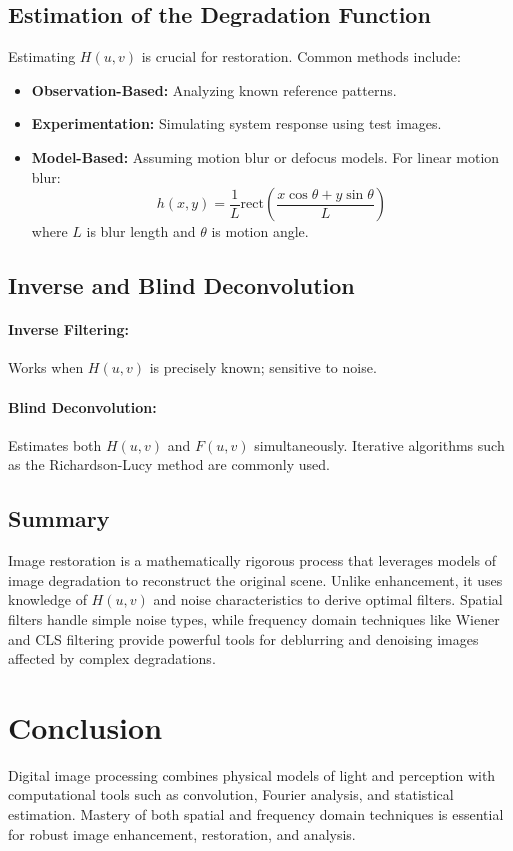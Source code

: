 \documentclass[12pt,a4paper]{AnantDocumentation}
\begin{document}
\subsection{Estimation of the Degradation Function}
Estimating $H(u,v)$ is crucial for restoration. Common methods include:
\begin{itemize}
\item \textbf{Observation-Based:} Analyzing known reference patterns.
\item \textbf{Experimentation:} Simulating system response using test images.
\item \textbf{Model-Based:} Assuming motion blur or defocus models. For linear motion blur:
\begin{equation}
h(x,y) = \frac{1}{L} \text{rect}\left(\frac{x\cos\theta + y\sin\theta}{L}\right)
\end{equation}
where $L$ is blur length and $\theta$ is motion angle.
\end{itemize}

\subsection{Inverse and Blind Deconvolution}
\paragraph{Inverse Filtering:} Works when $H(u,v)$ is precisely known; sensitive to noise.
\paragraph{Blind Deconvolution:} Estimates both $H(u,v)$ and $F(u,v)$ simultaneously. Iterative algorithms such as the Richardson-Lucy method are commonly used.

\subsection{Summary}
Image restoration is a mathematically rigorous process that leverages models of image degradation to reconstruct the original scene. Unlike enhancement, it uses knowledge of $H(u,v)$ and noise characteristics to derive optimal filters. Spatial filters handle simple noise types, while frequency domain techniques like Wiener and CLS filtering provide powerful tools for deblurring and denoising images affected by complex degradations.

\section{Conclusion}
Digital image processing combines physical models of light and perception with computational tools such as convolution, Fourier analysis, and statistical estimation. Mastery of both spatial and frequency domain techniques is essential for robust image enhancement, restoration, and analysis.
\end{document}
